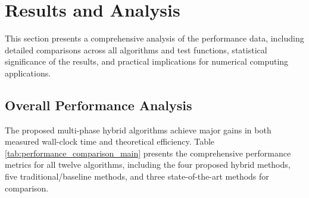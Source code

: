 \documentclass[amsmath, amssymb, aps]{revtex4-2}
\begin{document}
\section{Results and Analysis}\label{sec:results}
This section presents a comprehensive analysis of the performance data, including detailed comparisons across all algorithms and test functions, statistical significance of the results, and practical implications for numerical computing applications.

\subsection{Overall Performance Analysis}
The proposed multi-phase hybrid algorithms achieve major gains in both measured wall-clock time and theoretical efficiency. Table \ref{tab:performance_comparison_main} presents the comprehensive performance metrics for all twelve algorithms, including the four proposed hybrid methods, five traditional/baseline methods, and three state-of-the-art methods for comparison.
\end{document}
